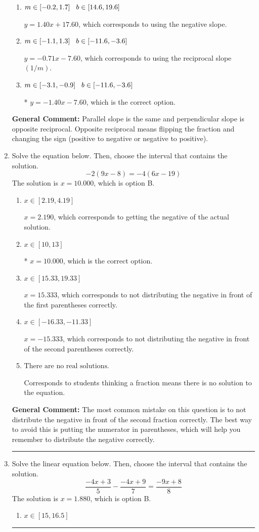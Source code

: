 \documentclass{extbook}[14pt]
\newcommand{\litem}[1]{\item #1

\rule{\textwidth}{0.4pt}}
\begin{document}
\begin{enumerate}
{\begin{enumerate}[label=\Alph*.]
 $y = -1.40x + 14.00$, which corresponds to correct slope and mis-distributing while simplifying to slope-intercept form.
\item \( m \in [-0.2, 1.7] \hspace*{3mm} b \in [14.6, 19.6] \)

 $y = 1.40x + 17.60$, which corresponds to using the negative slope.
\item \( m \in [-1.1, 1.3] \hspace*{3mm} b \in [-11.6, -3.6] \)

 $y = -0.71x - 7.60$, which corresponds to using the reciprocal slope $(1/m)$.
\item \( m \in [-3.1, -0.9] \hspace*{3mm} b \in [-11.6, -3.6] \)

* $y = -1.40x - 7.60$, which is the correct option.
\end{enumerate}

\textbf{General Comment:} Parallel slope is the same and perpendicular slope is opposite reciprocal. Opposite reciprocal means flipping the fraction and changing the sign (positive to negative or negative to positive).
}
\litem{
Solve the equation below. Then, choose the interval that contains the solution.
\[ -2(9x -8) = -4(6x -19) \]
The solution is \( x = 10.000 \), which is option B.\begin{enumerate}[label=\Alph*.]
\item \( x \in [2.19, 4.19] \)

$x = 2.190$, which corresponds to getting the negative of the actual solution.
\item \( x \in [10, 13] \)

* $x = 10.000$, which is the correct option.
\item \( x \in [15.33, 19.33] \)

$x = 15.333$, which corresponds to not distributing the negative in front of the first parentheses correctly.
\item \( x \in [-16.33, -11.33] \)

$x = -15.333$, which corresponds to not distributing the negative in front of the second parentheses correctly.
\item \( \text{There are no real solutions.} \)

Corresponds to students thinking a fraction means there is no solution to the equation.
\end{enumerate}

\textbf{General Comment:} The most common mistake on this question is to not distribute the negative in front of the second fraction correctly. The best way to avoid this is putting the numerator in parentheses, which will help you remember to distribute the negative correctly.
}
\litem{
Solve the linear equation below. Then, choose the interval that contains the solution.
\[ \frac{-4x + 3}{5} - \frac{-4x + 9}{7} = \frac{-9x + 8}{8} \]
The solution is \( x = 1.880 \), which is option B.\begin{enumerate}[label=\Alph*.]
\item \( x \in [15, 16.5] \)


\end{enumerate}}
\end{enumerate}
\end{document}
